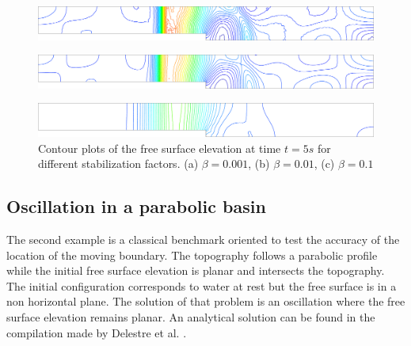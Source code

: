\documentclass[a4paper,12pt]{article}
\begin{document}
\begin{figure}[H]
    \begin{subfigure}{.05\textwidth}
        \caption{}
    \end{subfigure}
    \begin{minipage}[c]{.94\textwidth}
        \includegraphics[width=\textwidth]{img/step/stab_0.001_time_5.pdf}        
    \end{minipage}
    \par\medskip
    \begin{subfigure}{.05\textwidth}
        \caption{}
    \end{subfigure}
    \begin{minipage}[c]{.94\textwidth}
        \includegraphics[width=\textwidth]{img/step/stab_0.01_time_5.pdf}        
    \end{minipage}
    \par\medskip
    \begin{subfigure}{.05\textwidth}
        \caption{}
    \end{subfigure}
    \begin{minipage}[c]{.94\textwidth}
        \includegraphics[width=\textwidth]{img/step/stab_0.1_time_5.pdf}        
    \end{minipage}
\caption{Contour plots of the free surface elevation at time $t=5s$ for different stabilization factors. (a) $\beta=0.001$, (b) $\beta=0.01$, (c) $\beta=0.1$}
\label{stab_parameters_time2}
\end{figure}



\subsection{Oscillation in a parabolic basin}

The second example is a classical benchmark oriented to test the accuracy of the location of the moving boundary. The topography follows a parabolic profile while the initial free surface elevation is planar and intersects the topography. The initial configuration corresponds to water at rest but the free surface is in a non horizontal plane. The solution of that problem is an oscillation where the free surface elevation remains planar. An analytical solution can be found in the compilation made by Delestre et al. \cite{delestre2013}.
\end{document}
